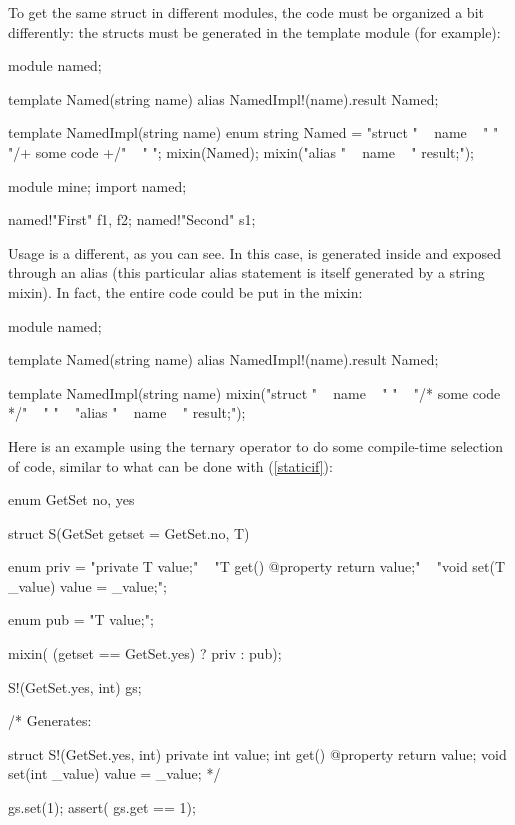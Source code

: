 To get the same struct in different modules, the code must be organized a bit differently: the structs must be generated in the template module (for example):

\begin{dcode}
module named;

template Named(string name)
{
    alias NamedImpl!(name).result Named;
}

template NamedImpl(string name)
{    
    enum string Named = "struct " ~ name ~ " { "
                      ~ "/+ some code +/"
                      ~ " }";
    mixin(Named);
    mixin("alias " ~ name ~ " result;");
}
\end{dcode}

\begin{dcode}
module mine;
import named;

named!"First" f1, f2;
named!"Second" s1;
\end{dcode}

Usage is a different, as you can see. In this case,  is generated inside  and exposed through an alias (this particular alias statement is itself generated by a string mixin). In fact, the entire code could be put in the mixin:

\begin{dcode}
module named;

template Named(string name)
{
    alias NamedImpl!(name).result Named;
}

template NamedImpl(string name)
{
mixin("struct " ~ name ~ " {"
                ~ "/* some code */"
                ~ " }\n"
   ~ "alias " ~ name ~ " result;");
}
\end{dcode}

Here is an example using the ternary  operator to do some compile-time selection of code, similar to what can be done with  (\ref{staticif}):

\begin{dcode}
enum GetSet { no, yes}

struct S(GetSet getset = GetSet.no, T)
{
    enum priv = "private T value;\n"
               ~ "T get() @property { return value;}\n"
               ~ "void set(T _value) { value = _value;}";

    enum pub = "T value;";

    mixin( (getset == GetSet.yes) ? priv : pub);
}

S!(GetSet.yes, int) gs;

/* Generates:

struct S!(GetSet.yes, int)
{
    private int value;
    int get() @property { return value;}
    void set(int _value) { value = _value;}
}
*/

gs.set(1);
assert( gs.get == 1);
\end{dcode}


